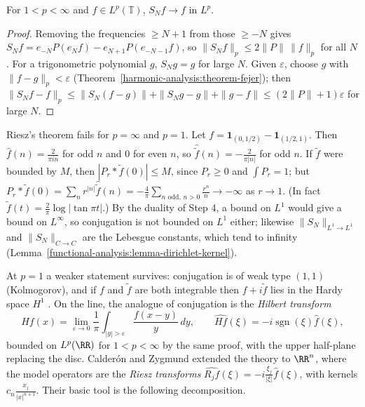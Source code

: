 \begin{corollary}\label{harmonic-analysis:corollary-lp-convergence}
For $1 < p < \infty$ and $f \in L^p(\mathbb{T})$, $S_Nf \to f$ in $L^p$.
\end{corollary}

\begin{proof}
Removing the frequencies $\geq N + 1$ from those $\geq -N$ gives $S_Nf = e_{-N}P(e_Nf) - e_{N+1}P(e_{-N-1}f)$, so $\|S_Nf\|_p \leq 2\|P\|\,\|f\|_p$ for all $N$. For a trigonometric polynomial $g$, $S_Ng = g$ for large
$N$. Given $\varepsilon$, choose $g$ with $\|f - g\|_p < \varepsilon$ (Theorem~\ref{harmonic-analysis:theorem-fejer}); then $\|S_Nf - f\|_p \leq \|S_N(f - g)\| + \|S_Ng - g\| + \|g - f\| \leq (2\|P\| + 1)\varepsilon$ for large $N$.
\end{proof}

\begin{counterexample}\label{harmonic-analysis:counterexample-conjugate-endpoints}
Riesz's theorem fails for $p = \infty$ and $p = 1$. Let $f = \mathbf{1}_{(0,1/2)} - \mathbf{1}_{(1/2,1)}$. Then $\hat f(n) = \frac{2}{\pi in}$ for odd $n$ and $0$ for even $n$, so $\hat{\tilde f}(n) = -\frac{2}{\pi|n|}$ for odd $n$.
If $\tilde f$ were bounded by $M$, then $|P_r * \tilde f(0)| \leq M$, since $P_r \geq 0$ and $\int P_r = 1$; but $P_r * \tilde f(0) = \sum_nr^{|n|}\hat{\tilde f}(n) = -\frac4\pi\sum_{n \text{ odd},\,n > 0}\frac{r^n}{n} \to -\infty$ as $r \to 1$.
(In fact $\tilde f(t) = \frac2\pi\log|\tan\pi t|$.) By the duality of Step 4, a bound on $L^1$ would give a bound on $L^\infty$, so conjugation is not bounded on $L^1$ either; likewise $\|S_N\|_{L^1 \to L^1}$ and
$\|S_N\|_{C \to C}$ are the Lebesgue constants, which tend to infinity (Lemma~\ref{functional-analysis:lemma-dirichlet-kernel}).
\end{counterexample}

\begin{remark}\label{harmonic-analysis:remark-kolmogorov}
At $p = 1$ a weaker statement survives: conjugation is of weak type $(1, 1)$ (Kolmogorov), and if $f$ and $\tilde f$ are both integrable then $f + i\tilde f$ lies in the Hardy space $H^1$ \cite{katznelson-harmonic}. On the line, the
analogue of conjugation is the \emph{Hilbert transform}
\[
Hf(x) = \lim_{\varepsilon \to 0}\frac1\pi\int_{|y| > \varepsilon}\frac{f(x - y)}{y}\,dy, \qquad \widehat{Hf}(\xi) = -i\operatorname{sgn}(\xi)\hat f(\xi),
\]
bounded on $L^p(\RR)$ for $1 < p < \infty$ by the same proof, with the upper half-plane replacing the disc. Calder\'on and Zygmund extended the theory to $\RR^n$, where the model operators are the \emph{Riesz transforms}
$\widehat{R_jf}(\xi) = -i\frac{\xi_j}{|\xi|}\hat f(\xi)$, with kernels $c_n\frac{x_j}{|x|^{n+1}}$. Their basic tool is the following decomposition.
\end{remark}

